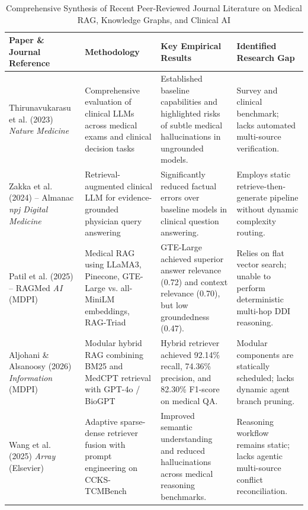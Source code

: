 \documentclass[conference]{IEEEtran}
\begin{document}
\begin{table}[htbp]
\centering
\caption{Comprehensive Synthesis of Recent Peer-Reviewed Journal Literature on Medical RAG, Knowledge Graphs, and Clinical AI}
\label{tab:literature_survey}
\renewcommand{\arraystretch}{1.3}
\begin{tabularx}{\textwidth}{|p{3.8cm}|X|X|X|}
\hline
\textbf{Paper \& Journal Reference} & \textbf{Methodology} & \textbf{Key Empirical Results} & \textbf{Identified Research Gap} \\ \hline
Thirunavukarasu et al. (2023) \cite{THIRUNAVUKARASU2023} \newline \textit{Nature Medicine} & Comprehensive evaluation of clinical LLMs across medical exams and clinical decision tasks & Established baseline capabilities and highlighted risks of subtle medical hallucinations in ungrounded models. & Survey and clinical benchmark; lacks automated multi-source verification. \\ \hline
Zakka et al. (2024) -- Almanac \cite{ZAKKA2024} \newline \textit{npj Digital Medicine} & Retrieval-augmented clinical LLM for evidence-grounded physician query answering & Significantly reduced factual errors over baseline models in clinical question answering. & Employs static retrieve-then-generate pipeline without dynamic complexity routing. \\ \hline
Patil et al. (2025) -- RAGMed \cite{ai6100240} \newline \textit{AI} (MDPI) & Medical RAG using LLaMA3, Pinecone, GTE-Large vs. all-MiniLM embeddings, RAG-Triad & GTE-Large achieved superior answer relevance (0.72) and context relevance (0.70), but low groundedness (0.47). & Relies on flat vector search; unable to perform deterministic multi-hop DDI reasoning. \\ \hline
Aljohani \& Alsanoosy (2026) \cite{info17020133} \newline \textit{Information} (MDPI) & Modular hybrid RAG combining BM25 and MedCPT retrieval with GPT-4o / BioGPT & Hybrid retriever achieved 92.14\% recall, 74.36\% precision, and 82.30\% F1-score on medical QA. & Modular components are statically scheduled; lacks dynamic agent branch pruning. \\ \hline
Wang et al. (2025) \cite{WANG2025100504} \newline \textit{Array} (Elsevier) & Adaptive sparse-dense retriever fusion with prompt engineering on CCKS-TCMBench & Improved semantic understanding and reduced hallucinations across medical reasoning benchmarks. & Reasoning workflow remains static; lacks agentic multi-source conflict reconciliation. \\ \hline

\end{tabularx}
\end{table}
\end{document}
